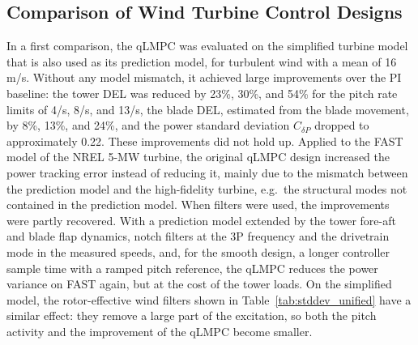 
\subsection{Comparison of Wind Turbine Control Designs}
\label{subsec:ComparisonWindTurbineControlDesigns}

In a first comparison, the qLMPC was evaluated on the simplified turbine model that is also
used as its prediction model, for turbulent wind with a mean of 16\,m/s. Without any model
mismatch, it achieved large improvements over the PI baseline: the tower DEL was reduced by 23\%, 30\%, and 54\% for the pitch rate limits of
4\textdegree/s, 8\textdegree/s, and 13\textdegree/s, the blade DEL, estimated from the blade
movement, by 8\%, 13\%, and 24\%, and the power standard deviation $C_{\delta P}$ dropped to
approximately 0.22. These improvements did not hold up. Applied to the FAST model of the NREL 5-MW
turbine, the original qLMPC design increased the power tracking error instead of reducing it,
mainly due to the mismatch between the prediction model and the high-fidelity turbine, e.g.\
the structural modes not contained in the prediction model. When filters were used, the
improvements were partly recovered. With a prediction model extended by the tower fore-aft and
blade flap dynamics, notch filters at the 3P frequency and the drivetrain mode in the measured
speeds, and, for the smooth design, a longer controller sample time with a ramped pitch
reference, the qLMPC reduces the power variance on FAST again, but at the cost of the tower
loads. On the simplified model, the
rotor-effective wind filters shown in Table~\ref{tab:stddev_unified} have a similar effect: they
remove a large part of the excitation, so both the pitch activity and the improvement of the
qLMPC become smaller.

